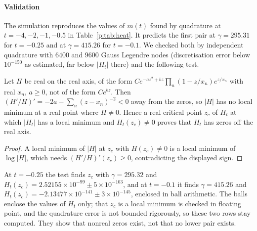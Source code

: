 \paragraph{Validation} The simulation reproduces the values of $m(t)$ found by quadrature at $t=-4,-2,-1,-0.5$ in Table~\ref{p:tab:heat}. It predicts the first pair at $\gamma=295.31$ for $t=-0.25$ and at $\gamma=415.26$ for $t=-0.1$. We checked both by independent quadrature with $6400$ and $9600$ Gauss Legendre nodes (discretisation error below $10^{-150}$ as estimated, far below $|H_t|$ there) and the following test.

\begin{proposition}\label{p:prop:crit}
Let $H$ be real on the real axis, of the form $Ce^{-az^2+bz}\prod_n(1-z/x_n)e^{z/x_n}$ with real $x_n$, $a\ge0$, not of the form $Ce^{bz}$. Then $(H'/H)'=-2a-\sum_n(z-x_n)^{-2}<0$ away from the zeros, so $|H|$ has no local minimum at a real point where $H\ne0$. Hence a real critical point $z_c$ of $H_t$ at which $|H_t|$ has a local minimum and $H_t(z_c)\ne0$ proves that $H_t$ has zeros off the real axis.
\end{proposition}

\begin{proof}
A local minimum of $|H|$ at $z_c$ with $H(z_c)\ne0$ is a local minimum of $\log|H|$, which needs $(H'/H)'(z_c)\ge0$, contradicting the displayed sign.
\end{proof}

At $t=-0.25$ the test finds $z_c$ with $\gamma=295.32$ and $H_t(z_c)=2.52155\times10^{-99}\pm5\times10^{-103}$, and at $t=-0.1$ it finds $\gamma=415.26$ and $H_t(z_c)=-2.13477\times10^{-141}\pm3\times10^{-145}$, enclosed in ball arithmetic. The balls enclose the values of $H_t$ only; that $z_c$ is a local minimum is checked in floating point, and the quadrature error is not bounded rigorously, so these two rows stay computed. They show that nonreal zeros exist, not that no lower pair exists.

